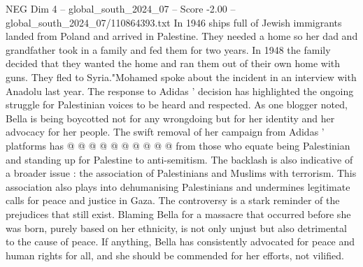 \begin{textsample}{NEG Dim 4 – global\_south\_2024\_07 – Score -2.00 – global\_south\_2024\_07/110864393.txt}
In 1946 ships full of Jewish immigrants landed from Poland and arrived in Palestine.
They needed a home so her dad and grandfather took in a family and fed them for two years.
In 1948 the family decided that they wanted the home and ran them out of their own home with guns.
They fled to Syria."Mohamed spoke about the incident in an interview with Anadolu last year.
The response to Adidas ' decision has highlighted the ongoing struggle for Palestinian voices to be heard and respected.
As one blogger noted, Bella is being boycotted not for any wrongdoing but for her identity and her advocacy for her people.
The swift removal of her campaign from Adidas ' platforms has @ @ @ @ @ @ @ @ @ @ from those who equate being Palestinian and standing up for Palestine to anti-semitism.
The backlash is also indicative of a broader issue : the association of Palestinians and Muslims with terrorism.
This association also plays into dehumanising Palestinians and undermines legitimate calls for peace and justice in Gaza.
The controversy is a stark reminder of the prejudices that still exist.
Blaming Bella for a massacre that occurred before she was born, purely based on her ethnicity, is not only unjust but also detrimental to the cause of peace.
If anything, Bella has consistently advocated for peace and human rights for all, and she should be commended for her efforts, not vilified.

\end{textsample}
